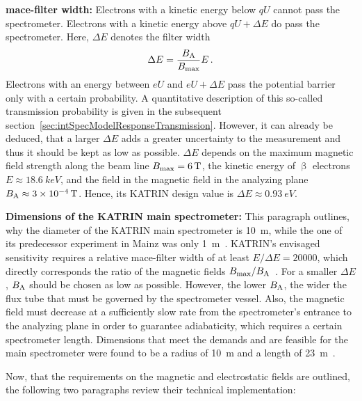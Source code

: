 {\par \textbf{\gls{mace}-filter width:} 
Electrons with a kinetic energy below $qU$ cannot pass the spectrometer. Electrons with a kinetic energy above $qU+\Delta E$ do pass the spectrometer. Here, $\Delta E$ denotes the filter width \cite{Angrik:2005ep}
\begin{equation}
\Delta E = \frac{B_\mathrm{A}}{B_\mathrm{max}} E
\text{\,.}
\end{equation}
Electrons with an energy between $eU$ and $eU+\Delta E$ pass the potential barrier only with a certain probability. A quantitative description of this so-called transmission probability is given in the subsequent section~\ref{sec:intSpecModelResponseTransmission}. However, it can already be deduced, that a larger $\Delta E$ adds a greater uncertainty to the measurement and thus it should be kept as low as possible. $\Delta E$ depends on the maximum magnetic field strength along the beam line $B_\mathrm{max}=\SI{6}{T}$, the kinetic energy of $\upbeta$ electrons $E\approx\SI{18.6}{keV}$, and the field in the magnetic field in the analyzing plane $B_\mathrm{A}\approx\SI{3e-4}{T}$. Hence, its KATRIN design value is $\Delta E\approx\SI{0.93}{eV}$. }

{\par \textbf{Dimensions of the KATRIN main spectrometer:} This paragraph outlines, why the diameter of the KATRIN main spectrometer is \SI{10}{m}, while the one of its predecessor experiment in Mainz was only \SI{1}{m}~\cite{Kraus2005}. KATRIN's envisaged sensitivity requires a relative \gls{mace}-filter width of at least $E/\Delta E = 20000$, which directly corresponds the ratio of the magnetic fields $B_\mathrm{max}/B_\mathrm{A}$~\cite{Angrik:2005ep}. For a smaller $\Delta E$, $B_\mathrm{A}$ should be chosen as low as possible. However, the lower $B_\mathrm{A}$, the wider the flux tube that must be governed by the spectrometer vessel. Also, the magnetic field must decrease at a sufficiently slow rate from the spectrometer's entrance to the analyzing plane in order to guarantee adiabaticity, which requires a certain spectrometer length. Dimensions that meet the demands and are feasible for the main spectrometer were found to be a radius of \SI{10}{m} and a length of \SI{23}{m}~\cite{Angrik:2005ep, Valerius2009}.}

Now, that the requirements on the magnetic and electrostatic fields are outlined, the following two paragraphs review their technical implementation:

